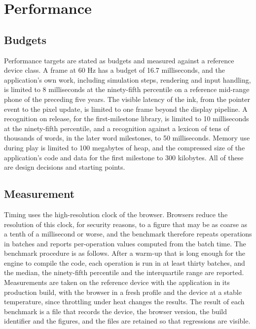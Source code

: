 \chapter{Performance}\label{ch:performance}

\section{Budgets}

Performance targets are stated as budgets and measured against a reference device class. A frame at 60 Hz has a budget of 16.7 milliseconds, and the application's own work, including simulation steps, rendering and input handling, is limited to 8 milliseconds at the ninety-fifth percentile on a reference mid-range phone of the preceding five years. The visible latency of the ink, from the pointer event to the pixel update, is limited to one frame beyond the display pipeline. A recognition on release, for the first-milestone library, is limited to 10 milliseconds at the ninety-fifth percentile, and a recognition against a lexicon of tens of thousands of words, in the later word milestones, to 50 milliseconds. Memory use during play is limited to 100 megabytes of heap, and the compressed size of the application's code and data for the first milestone to 300 kilobytes. All of these are design decisions and starting points.\evS

\section{Measurement}

Timing uses the high-resolution clock of the browser. Browsers reduce the resolution of this clock, for security reasons, to a figure that may be as coarse as a tenth of a millisecond or worse, and the benchmark therefore repeats operations in batches and reports per-operation values computed from the batch time.\evD{} The benchmark procedure is as follows. After a warm-up that is long enough for the engine to compile the code, each operation is run in at least thirty batches, and the median, the ninety-fifth percentile and the interquartile range are reported. Measurements are taken on the reference device with the application in its production build, with the browser in a fresh profile and the device at a stable temperature, since throttling under heat changes the results. The result of each benchmark is a file that records the device, the browser version, the build identifier and the figures, and the files are retained so that regressions are visible.

